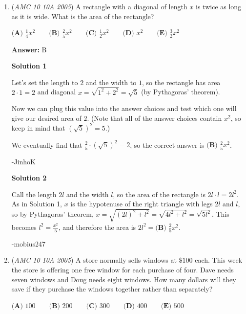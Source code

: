 \begin{enumerate}
\textbf{Solution}

$2x + 7 = 3 \iff x = -2$, so we require $-2b-10 = -2 \iff -2b = 8 \iff b = \boxed{\textbf{(B) } -4}$.

 


	\item (\textit{AMC 10 10A 2005}) A rectangle with a diagonal of length $x$ is twice as long as it is wide. What is the area of the rectangle? 


 $\textbf{(A) } \frac{1}{4}x^2\qquad \textbf{(B) } \frac{2}{5}x^2\qquad \textbf{(C) } \frac{1}{2}x^2\qquad \textbf{(D) } x^2\qquad \textbf{(E) } \frac{3}{2}x^2$

 \textbf{Answer: }B



\textbf{Solution 1}

Let's set the length to $2$ and the width to $1$, so the rectangle has area $2 \cdot 1 = 2$ and diagonal $x = \sqrt{1^2+2^2} = \sqrt{5}$ (by Pythagoras' theorem).

 Now we can plug this value into the answer choices and test which one will give our desired area of $2$. (Note that all of the answer choices contain $x^2$, so keep in mind that $\left(\sqrt{5}\right)^2 = 5$.)

 We eventually find that $\frac{2}{5} \cdot \left(\sqrt{5}\right)^2 = 2$, so the correct answer is $\boxed{\textbf{(B) } \frac{2}{5}x^2}$.

 -JinhoK

 



\textbf{Solution 2}

Call the length $2l$ and the width $l$, so the area of the rectangle is $2l \cdot l = 2l^2$. As in Solution 1, $x$ is the hypotenuse of the right triangle with legs $2l$ and $l$, so by Pythagoras' theorem, $x = \sqrt{\left(2l\right)^2+l^2} = \sqrt{4l^2+l^2} = \sqrt{5l^2}$. This becomes $l^2 = \frac{x^2}{5}$, and therefore the area is $2l^2 = \boxed{\textbf{(B) } \frac{2}{5}x^2}$.

 -mobius247

 


	\item (\textit{AMC 10 10A 2005}) A store normally sells windows at $\$100$ each. This week the store is offering one free window for each purchase of four. Dave needs seven windows and Doug needs eight windows. How many dollars will they save if they purchase the windows together rather than separately?


 $\textbf{(A) } 100\qquad \textbf{(B) } 200\qquad \textbf{(C) } 300\qquad \textbf{(D) } 400\qquad \textbf{(E) } 500$


\end{enumerate}
